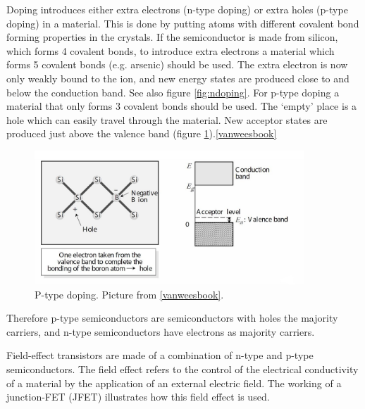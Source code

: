 Doping introduces either extra electrons (n-type doping) or extra holes (p-type doping) in a material. This is done by putting atoms with different covalent bond forming properties in the crystals. If the semiconductor is made from silicon, which forms 4 covalent bonds, to introduce extra electrons a material which forms 5 covalent bonds (e.g. arsenic) should be used. The extra electron is now only weakly bound to the ion, and new energy states are produced close to and below the conduction band. See also figure \ref{fig:ndoping}. For p-type doping a material that only forms 3 covalent bonds should be used. The `empty' place is a hole which can easily travel through the material. New acceptor states are produced just above the valence band (figure \ref{fig:pdoping}).\ref{vanweesbook} %

\begin{figure}[!ht]
 \begin{center}
  \includegraphics[width=0.9\textwidth]{pdoping}
  \caption{P-type doping. Picture from \ref{vanweesbook}.}
  \label{fig:pdoping}
 \end{center}
\end{figure}

Therefore p-type semiconductors are semiconductors with holes the majority carriers, and n-type semiconductors have electrons as majority carriers.

Field-effect transistors are made of a combination of n-type and p-type semiconductors. The field effect refers to the control of the electrical conductivity of a material by the application of an external electric field. The working of a junction-FET (JFET) illustrates how this field effect is used.

